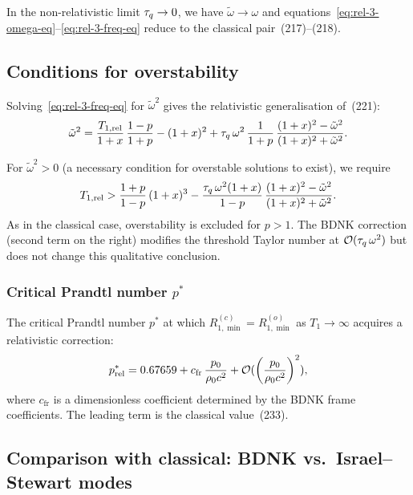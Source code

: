 In the non-relativistic limit $\tau_{q}\to 0$, we have
$\tilde{\omega}\to\omega$ and equations~\eqref{eq:rel-3-omega-eq}--\eqref{eq:rel-3-freq-eq}
reduce to the classical pair~(217)--(218).

\subsection{Conditions for overstability}

Solving~\eqref{eq:rel-3-freq-eq} for $\tilde{\omega}^{2}$ gives the
relativistic generalisation of~(221):
\begin{equation}\label{eq:rel-3-omega2-sol}
  \tilde{\omega}^{2}
  = \frac{T_{1,\mathrm{rel}}}{1+x}\,\frac{1-p}{1+p}
    - (1+x)^{2}
    + \tau_{q}\,\omega^{2}\,\frac{1}{1+p}\,\frac{(1+x)^{2}-\tilde{\omega}^{2}}
         {(1+x)^{2}+\tilde{\omega}^{2}}.
\end{equation}

For $\tilde{\omega}^{2}>0$ (a necessary condition for overstable
solutions to exist), we require
\begin{equation}\label{eq:rel-3-overstab-cond}
  T_{1,\mathrm{rel}} > \frac{1+p}{1-p}\,(1+x)^{3}
  - \frac{\tau_{q}\,\omega^{2}(1+x)}{1-p}\,
    \frac{(1+x)^{2}-\tilde{\omega}^{2}}
         {(1+x)^{2}+\tilde{\omega}^{2}}.
\end{equation}
As in the classical case, overstability is excluded for $p > 1$.
The BDNK correction (second term on the right) modifies
the threshold Taylor number at $\mathcal{O}(\tau_{q}\,\omega^{2})$ but does
not change this qualitative conclusion.

\subsubsection*{Critical Prandtl number $p^{*}$}

The critical Prandtl number $p^{*}$ at which
$R_{1,\min}^{(c)} = R_{1,\min}^{(o)}$ as $T_{1}\to\infty$
acquires a relativistic correction:
\begin{equation}\label{eq:rel-3-pstar}
  p^{*}_{\mathrm{rel}}
  = 0.67659
    + c_{\mathrm{fr}}\,
      \frac{p_{0}}{\rho_0 c^{2}}
    + \mathcal{O}(\left(\frac{p_{0}}{\rho_0 c^{2}}\right)^{2}),
\end{equation}
where $c_{\mathrm{fr}}$ is a dimensionless coefficient determined by the
BDNK frame coefficients.  The leading term is the classical value~(233).

\subsection{Comparison with classical: BDNK vs.\ Israel--Stewart modes}

